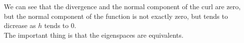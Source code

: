 We can see that the divergence and the normal component of the curl are zero, but the normal component of the function is not exactly zero, but tends to dicrease as $h$ tends to 0.\\
The important thing is that the eigenspaces are equivalents.\\




